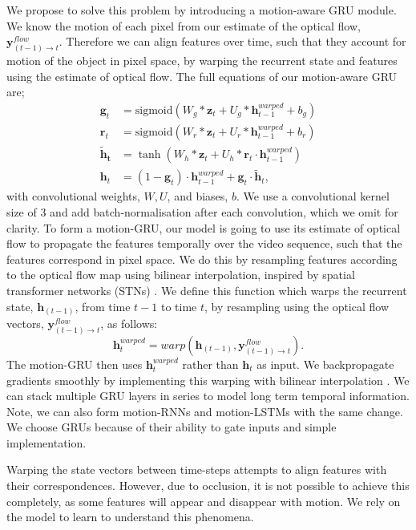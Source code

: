 We propose to solve this problem by introducing a motion-aware GRU module. We know the motion of each pixel from our estimate of the optical flow, $\mathbf{y}^{flow}_{(t-1) \to t}$. Therefore we can align features over time, such that they account for motion of the object in pixel space, by warping the recurrent state and features using the estimate of optical flow. The full equations of our motion-aware GRU are;
\begin{align}
\mathbf{g}_t &= \text{sigmoid}(W_g * \mathbf{z}_t + U_g * \mathbf{h}^{warped}_{t-1} + b_g) \\
\mathbf{r}_t &= \text{sigmoid}(W_r * \mathbf{z}_t + U_r * \mathbf{h}^{warped}_{t-1} + b_r) \\
\mathbf{\widetilde{h}_t} &= \tanh (W_h * \mathbf{z}_t + U_h * \mathbf{r}_t \cdot \mathbf{h}^{warped}_{t-1}) \\
\mathbf{h}_t &= (1-\mathbf{g}_t) \cdot \mathbf{h}^{warped}_{t-1} + \mathbf{g}_t \cdot \mathbf{\widetilde{h}}_t,
\end{align}
with convolutional weights, $W, U$, and biases, $b$. We use a convolutional kernel size of 3 and add batch-normalisation after each convolution, which we omit for clarity. To form a motion-GRU, our model is going to use its estimate of optical flow to propagate the features temporally over the video sequence, such that the features correspond in pixel space. We do this by resampling features according to the optical flow map using bilinear interpolation, inspired by spatial transformer networks (STNs) \cite{jaderberg2015spatial}.
We define this function which warps the recurrent state, $\mathbf{h}_{(t-1)}$, from time $t-1$ to time $t$, by resampling using the optical flow vectors, $\mathbf{y}^{flow}_{(t-1) \to t}$, as follows:
\begin{equation}
\mathbf{h}^{warped}_{t} = warp(\mathbf{h}_{(t-1)}, \mathbf{y}^{flow}_{(t-1) \to t}).
\end{equation}
The motion-GRU then uses $\mathbf{h}^{warped}_{t}$ rather than $\mathbf{h}_t$ as input. We backpropagate gradients smoothly by implementing this warping with bilinear interpolation \cite{jaderberg2015spatial}. We can stack multiple GRU layers in series to model long term temporal information. Note, we can also form motion-RNNs and motion-LSTMs with the same change. We choose GRUs because of their ability to gate inputs and simple implementation.

Warping the state vectors between time-steps attempts to align features with their correspondences. However, due to occlusion, it is not possible to achieve this completely, as some features will appear and disappear with motion. We rely on the model to learn to understand this phenomena.

